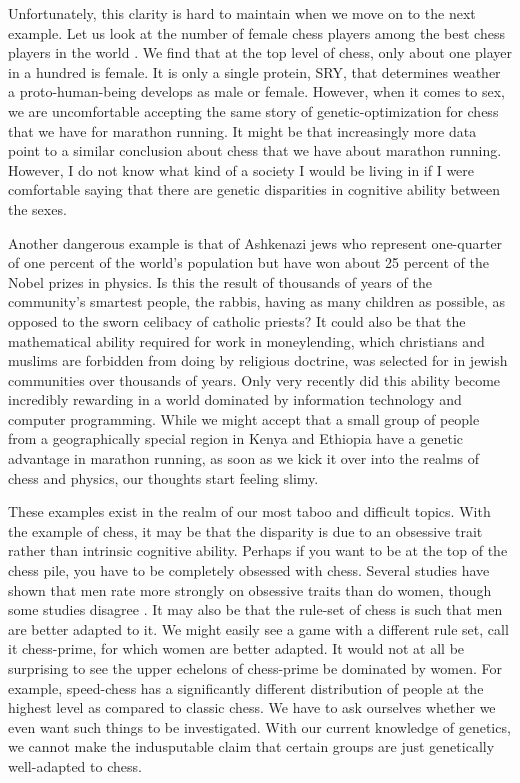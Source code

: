 Unfortunately, this clarity is hard to maintain when we move on to the next example.
Let us look at the number of female chess players among the best chess players in the world \cite{chess2020}.
We find that at the top level of chess, only about one player in a hundred is female.
It is only a single protein, SRY, that determines weather a proto-human-being develops as male or female.
However, when it comes to sex, we are uncomfortable accepting the same story of genetic-optimization for chess that we have for marathon running.
It might be that increasingly more data point to a similar conclusion about chess that we have about marathon running.
However, I do not know what kind of a society I would be living in if I were comfortable saying that there are genetic disparities in cognitive ability between the sexes.

Another dangerous example is that of Ashkenazi jews who represent one-quarter of one percent of the world's population but have won about 25 percent of the Nobel prizes in physics.
Is this the result of thousands of years of the community's smartest people, the rabbis, having as many children as possible, as opposed to the sworn celibacy of catholic priests?
It could also be that the mathematical ability required for work in moneylending, which christians and muslims are forbidden from doing by religious doctrine, was selected for in jewish communities over thousands of years.
Only very recently did this ability become incredibly rewarding in a world dominated by information technology and computer programming.
While we might accept that a small group of people from a geographically special region in Kenya and Ethiopia have a genetic advantage in marathon running, as soon as we kick it over into the realms of chess and physics, our thoughts start feeling slimy.

These examples exist in the realm of our most taboo and difficult topics.
With the example of chess, it may be that the disparity is due to an obsessive trait rather than intrinsic cognitive ability.
Perhaps if you want to be at the top of the chess pile, you have to be completely obsessed with chess.
Several studies have shown that men rate more strongly on obsessive traits than do women, though some studies disagree \cite{Mathis2011}.
It may also be that the rule-set of chess is such that men are better adapted to it.
We might easily see a game with a different rule set, call it chess-prime, for which women are better adapted.
It would not at all be surprising to see the upper echelons of chess-prime be dominated by women.
For example, speed-chess has a significantly different distribution of people at the highest level as compared to classic chess.
We have to ask ourselves whether we even want such things to be investigated.
With our current knowledge of genetics, we cannot make the indusputable claim that certain groups are just genetically well-adapted to chess.

